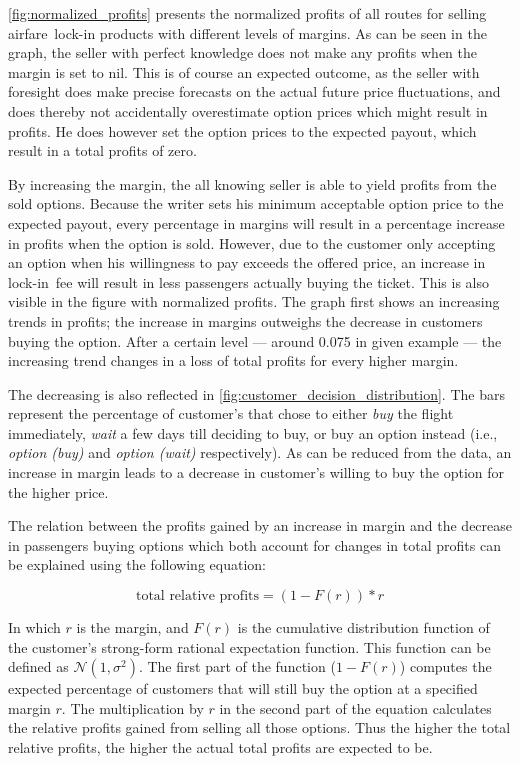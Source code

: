 \autoref{fig:normalized_profits} presents the normalized profits of all routes for selling airfare~lock-in products with different levels of margins. As can be seen in the graph, the seller with perfect knowledge does not make any profits when the margin is set to nil. This is of course an expected outcome, as the seller with foresight does make precise forecasts on the actual future price fluctuations, and does thereby not accidentally overestimate option prices which might result in profits. He does however set the option prices to the expected payout, which result in a total profits of zero.


By increasing the margin, the all knowing seller is able to yield profits from the sold options. Because the writer sets his minimum acceptable option price to the expected payout, every percentage in margins will result in a percentage increase in profits when the option is sold. However, due to the customer only accepting an option when his willingness to pay exceeds the offered price, an increase in lock-in~fee will result in less passengers actually buying the ticket. This is also visible in the figure with normalized profits. The graph first shows an increasing trends in profits; the increase in margins outweighs the decrease in customers buying the option. After a certain level --- around 0.075 in given example --- the increasing trend changes in a loss of total profits for every higher margin.

The decreasing is also reflected in \autoref{fig:customer_decision_distribution}. The bars represent the percentage of customer's that chose to either \emph{buy} the flight immediately, \emph{wait} a few days till deciding to buy, or buy an option instead (i.e., \emph{option (buy)} and \emph{option (wait)} respectively). As can be reduced from the data, an increase in margin leads to a decrease in customer's willing to buy the option for the higher price.


The relation between the profits gained by an increase in margin and the decrease in passengers buying options which both account for changes in total profits can be explained using the following equation:

$$ \mbox{total relative profits} = (1 - F(r)) * r $$

In which $r$ is the margin, and $F(r)$ is the cumulative distribution function of the customer's strong-form rational expectation function. This function can be defined as $\mathcal{N}(1, \sigma^2)$. The first part of the function ($1 - F(r)$) computes the expected percentage of customers that will still buy the option at a specified margin $r$. The multiplication by $r$ in the second part of the equation calculates the relative profits gained from selling all those options. Thus the higher the total relative profits, the higher the actual total profits are expected to be.

